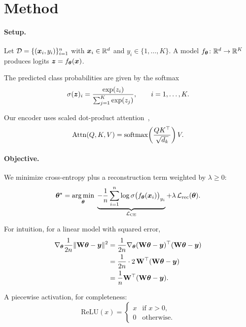\section{Method}\label{sec:method}

\paragraph{Setup.}
Let $\mathcal{D} = \{(\bm{x}_i, y_i)\}_{i=1}^{n}$ with $\bm{x}_i \in \mathbb{R}^d$ and $y_i \in \{1, \ldots, K\}$.
A model $f_{\bm{\theta}} \colon \mathbb{R}^d \to \mathbb{R}^K$ produces logits $\bm{z} = f_{\bm{\theta}}(\bm{x})$.

The predicted class probabilities are given by the softmax
\begin{equation}
  \sigma(\bm{z})_i = \frac{\exp(z_i)}{\sum_{j=1}^{K} \exp(z_j)}, \qquad i = 1, \ldots, K.
  \label{eq:softmax}
\end{equation}

Our encoder uses scaled dot-product attention~\citep{vaswani2017attention},
\[
  \mathrm{Attn}(Q, K, V) = \operatorname{softmax}\!\left( \frac{Q K^{\top}}{\sqrt{d_k}} \right) V .
\]

\paragraph{Objective.}
We minimize cross-entropy plus a reconstruction term weighted by $\lambda \ge 0$:
\begin{equation}
  \bm{\theta}^\star = \operatorname*{arg\,min}_{\bm{\theta}} \;
  \underbrace{-\frac{1}{n}\sum_{i=1}^{n} \log \sigma\bigl(f_{\bm{\theta}}(\bm{x}_i)\bigr)_{y_i}}_{\mathcal{L}_{\text{CE}}}
  + \lambda \, \mathcal{L}_{\text{rec}}(\bm{\theta}).
  \label{eq:objective}
\end{equation}

For intuition, for a linear model with squared error,
\begin{align}
  \nabla_{\bm{\theta}} \frac{1}{2n}\lVert\mathbf{W}\bm{\theta} - \bm{y}\rVert^2
    &= \frac{1}{2n} \nabla_{\bm{\theta}} (\mathbf{W}\bm{\theta} - \bm{y})^{\top}(\mathbf{W}\bm{\theta} - \bm{y}) \nonumber \\
    &= \frac{1}{2n} \cdot 2\, \mathbf{W}^{\top} (\mathbf{W}\bm{\theta} - \bm{y}) \nonumber \\
    &= \frac{1}{n} \mathbf{W}^{\top} (\mathbf{W}\bm{\theta} - \bm{y}). \label{eq:mse-grad}
\end{align}

A piecewise activation, for completeness:
\[
  \mathrm{ReLU}(x) =
  \begin{cases}
    x & \text{if } x > 0, \\
    0 & \text{otherwise.}
  \end{cases}
\]


